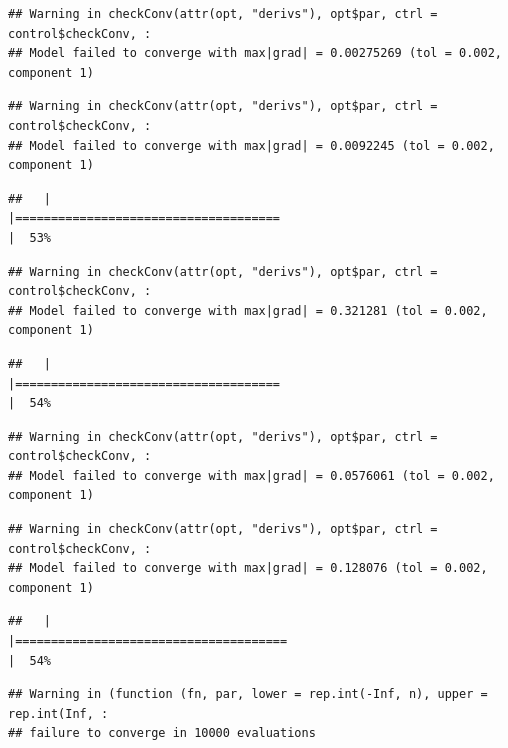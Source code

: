 \documentclass[
  12pt,
]{book}
\begin{document}
\begin{verbatim}
## Warning in checkConv(attr(opt, "derivs"), opt$par, ctrl = control$checkConv, :
## Model failed to converge with max|grad| = 0.00275269 (tol = 0.002, component 1)
\end{verbatim}

\begin{verbatim}
## Warning in checkConv(attr(opt, "derivs"), opt$par, ctrl = control$checkConv, :
## Model failed to converge with max|grad| = 0.0092245 (tol = 0.002, component 1)
\end{verbatim}

\begin{verbatim}
##   |                                                                              |=====================================                                 |  53%
\end{verbatim}

\begin{verbatim}
## Warning in checkConv(attr(opt, "derivs"), opt$par, ctrl = control$checkConv, :
## Model failed to converge with max|grad| = 0.321281 (tol = 0.002, component 1)
\end{verbatim}

\begin{verbatim}
##   |                                                                              |=====================================                                 |  54%
\end{verbatim}

\begin{verbatim}
## Warning in checkConv(attr(opt, "derivs"), opt$par, ctrl = control$checkConv, :
## Model failed to converge with max|grad| = 0.0576061 (tol = 0.002, component 1)
\end{verbatim}

\begin{verbatim}
## Warning in checkConv(attr(opt, "derivs"), opt$par, ctrl = control$checkConv, :
## Model failed to converge with max|grad| = 0.128076 (tol = 0.002, component 1)
\end{verbatim}

\begin{verbatim}
##   |                                                                              |======================================                                |  54%
\end{verbatim}

\begin{verbatim}
## Warning in (function (fn, par, lower = rep.int(-Inf, n), upper = rep.int(Inf, :
## failure to converge in 10000 evaluations
\end{verbatim}
\end{document}
